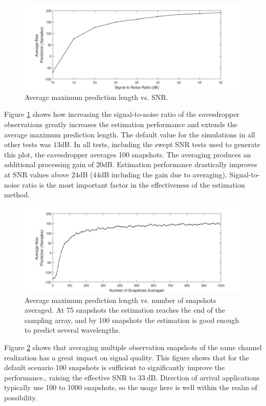 \documentclass{allertonproc}
\begin{document}
\begin{figure}[tbp]
\begin{center}
\includegraphics[width=6in]{signalToNoise.jpg}
\caption{Average maximum prediction length vs. SNR. }\label{SNR}
\end{center}
\end{figure}
Figure \ref{SNR} shows how increasing the signal-to-noise ratio of the eavesdropper observations greatly increases the estimation performance and extends the average maximum prediction length. The default value for the simulations in all other tests was $13$dB. In all tests, including the swept SNR tests used to generate this plot, the eavesdropper averages 100 snapshots. The averaging produces an additional processing gain of $20$dB. Estimation performance drastically improves at SNR values above $24$dB ($44$dB including the gain due to averaging). Signal-to-noise ratio is the most important factor in the effectiveness of the estimation method.

\begin{figure}[tbp]
\begin{center}
\includegraphics[width=6in]{numSnapshots.jpg}
\caption{Average maximum prediction length vs. number of snapshots averaged. At 75 snapshots the estimation reaches the end of the sampling array, and by 100 snapshots the estimation is good enough to predict several wavelengths.}\label{snapshot}
\end{center}
\end{figure}
Figure \ref{snapshot} shows that averaging multiple observation snapshots of the same channel realization has a great impact on signal quality. This figure shows that for the default scenario 100 snapshots is sufficient to significantly improve the performance., raising the effective SNR to $33 \ \mathrm{dB}$. Direction of arrival applications typically use 100 to 1000 snapshots, so the usage here is well within the realm of possibility. %
\end{document}
